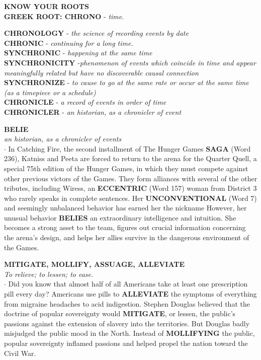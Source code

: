 \documentclass{exam}
\begin{document}
\begin{questions}
\begin{tcolorbox}
\begin{center}
\textbf{ KNOW YOUR ROOTS}\\
\textbf{GREEK ROOT: CHRONO } - \textit{time}.\\  
\end{center}  
\textbf{CHRONOLOGY} - \textit{the science of recording events by date}\\ 
\textbf{CHRONIC} - \textit{continuing for a long time.}\\ \textbf{SYNCHRONIC} - \textit{happening at the same time}\\ 
\textbf{SYNCHRONICITY} -\textit{phenomenon of events which coincide in time and appear meaningfully related but have no discoverable causal connection}\\ \textbf{SYNCHRONIZE} -  \textit{to cause to go at the same rate or occur at the same time (as a timepiece or a schedule)}\\ 
\textbf{CHRONICLE} -  \textit{a record of events in order of time}\\ 
\textbf{CHRONICLER} -  \textit{an historian, as a chronicler of event}
\end{tcolorbox}

\question \textbf{BELIE}\\ \textit{an historian, as a chronicler of events}\\

$\cdot$ In Catching Fire, the second installment of The Hunger Games \textbf{SAGA} (Word 236), Katniss and Peeta are forced to return to the arena for the Quarter Quell, a special 75th edition of the Hunger Games, in which they must compete against other previous victors of the Games. They form alliances with several of the other tributes, including Wiress, an \textbf{ECCENTRIC} (Word 157) woman from District 3 who rarely speaks in complete sentences. Her \textbf{UNCONVENTIONAL} (Word 7) and seemingly unbalanced behavior has earned her the nickname  However, her unusual behavior \textbf{BELIES} an extraordinary intelligence and intuition. She becomes a strong asset to the team, figures out crucial information concerning the arena's design, and helps her allies survive in the dangerous environment of the Games.

\question \textbf{MITIGATE, MOLLIFY, ASSUAGE, ALLEVIATE}\\ \textit{To relieve; to lessen; to ease.}\\

$\cdot$ Did you know that almost half of all Americans take at least one prescription pill every day? Americans use pills to \textbf{ALLEVIATE} the symptoms of everything from migraine headaches to acid indigestion. Stephen Douglas believed that the doctrine of popular sovereignty would \textbf{MITIGATE}, or lessen, the public's passions against the extension of slavery into the territories. But Douglas badly misjudged the public mood in the North. Instead of \textbf{MOLLIFYING} the public, popular sovereignty inflamed passions and helped propel the nation toward the Civil War.


\end{questions}
\end{document}
